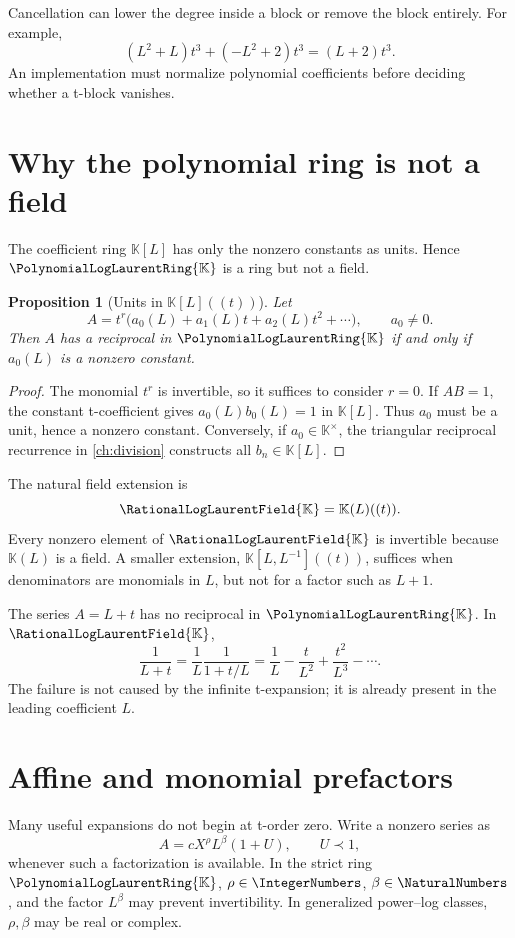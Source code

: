 \documentclass[11pt,openany]{book}
\theoremstyle{definition}
\theoremstyle{plain}
\newtheorem{proposition}{Proposition}[chapter]
\theoremstyle{remark}
\newcommand{\K}{\mathbb{K}}
\begin{document}
Cancellation can lower the degree inside a block or remove the block entirely.
For example,
\[
 (L^2+L)t^3+(-L^2+2)t^3=(L+2)t^3.
\]
An implementation must normalize polynomial coefficients before deciding
whether a t-block vanishes.

\section{Why the polynomial ring is not a field}
The coefficient ring \(\K[L]\) has only the nonzero constants as units.  Hence
\(\PolynomialLogLaurentRing{\K}\) is a ring but not a field.

\begin{proposition}[{Units in \(\K[L]((t))\)}]\label{prop:units}
Let
\[
 A=t^r\bigl(a_0(L)+a_1(L)t+a_2(L)t^2+\cdots\bigr),
 \qquad a_0\ne0.
\]
Then \(A\) has a reciprocal in \(\PolynomialLogLaurentRing{\K}\) if and only if \(a_0(L)\) is a
nonzero constant.
\end{proposition}
\begin{proof}
The monomial \(t^r\) is invertible, so it suffices to consider \(r=0\).  If
\(AB=1\), the constant t-coefficient gives \(a_0(L)b_0(L)=1\) in
\(\K[L]\).  Thus \(a_0\) must be a unit, hence a nonzero constant.  Conversely,
if \(a_0\in\K^\times\), the triangular reciprocal recurrence in
\cref{ch:division} constructs all \(b_n\in\K[L]\).
\end{proof}

The natural field extension is
\begin{equation}\label{eq:rational-log-field}
 \RationalLogLaurentField{\K}=\K(L)((t)).
\end{equation}
Every nonzero element of \(\RationalLogLaurentField{\K}\) is invertible because \(\K(L)\) is a
field.  A smaller extension, \(\K[L,L^{-1}]((t))\), suffices when denominators
are monomials in \(L\), but not for a factor such as \(L+1\).

\begin{workedbox}
The series \(A=L+t\) has no reciprocal in \(\PolynomialLogLaurentRing{\K}\).  In \(\RationalLogLaurentField{\K}\),
\[
 \frac1{L+t}
 =\frac1L\frac1{1+t/L}
 =\frac1L-\frac{t}{L^2}+\frac{t^2}{L^3}-\cdots.
\]
The failure is not caused by the infinite t-expansion; it is already present in
the leading coefficient \(L\).
\end{workedbox}

\section{Affine and monomial prefactors}
Many useful expansions do not begin at t-order zero.  Write a nonzero series as
\begin{equation}\label{eq:prefactor-form}
 A=cX^\rho L^\beta(1+U),
 \qquad U\prec1,
\end{equation}
whenever such a factorization is available.  In the strict ring
\(\PolynomialLogLaurentRing{\K}\), \(\rho\in\IntegerNumbers\), \(\beta\in\NaturalNumbers\), and the factor \(L^\beta\) may
prevent invertibility.  In generalized power--log classes, \(\rho,\beta\) may be
real or complex.
\end{document}
